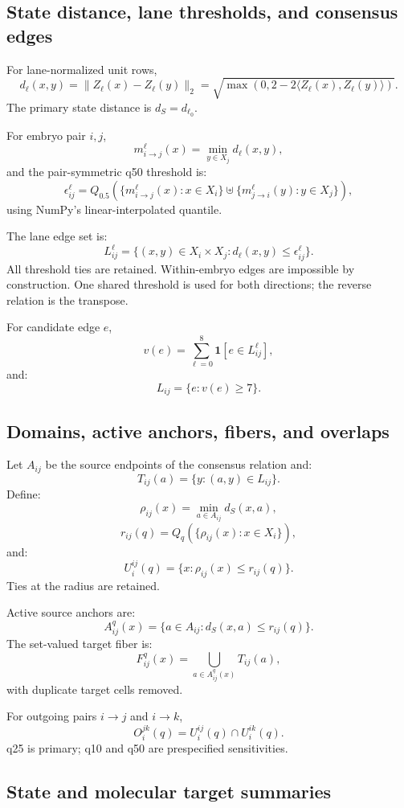\documentclass[11pt]{article}
\begin{document}
\subsection{State distance, lane thresholds, and consensus edges}

For lane-normalized unit rows,
\[
d_\ell(x,y)
=
\|Z_\ell(x)-Z_\ell(y)\|_2
=
\sqrt{
\max\left(
0,
2-2\langle Z_\ell(x),Z_\ell(y)\rangle
\right)
}.
\]
The primary state distance is \(d_S=d_{\ell_0}\).

For embryo pair \(i,j\),
\[
m_{i\to j}^{\ell}(x)
=
\min_{y\in X_j}d_\ell(x,y),
\]
and the pair-symmetric q50 threshold is:
\[
\epsilon_{ij}^{\ell}
=
Q_{0.5}
\left(
\{m_{i\to j}^{\ell}(x):x\in X_i\}
\uplus
\{m_{j\to i}^{\ell}(y):y\in X_j\}
\right),
\]
using NumPy's linear-interpolated quantile.

The lane edge set is:
\[
L_{ij}^{\ell}
=
\{(x,y)\in X_i\times X_j:
d_\ell(x,y)\le\epsilon_{ij}^{\ell}\}.
\]
All threshold ties are retained. Within-embryo edges are impossible by construction. One shared threshold is used for both directions; the reverse relation is the transpose.

For candidate edge \(e\),
\[
v(e)=
\sum_{\ell=0}^{8}
\mathbf 1[e\in L_{ij}^{\ell}],
\]
and:
\[
L_{ij}
=
\{e:v(e)\ge7\}.
\]

\subsection{Domains, active anchors, fibers, and overlaps}

Let \(A_{ij}\) be the source endpoints of the consensus relation and:
\[
T_{ij}(a)=
\{y:(a,y)\in L_{ij}\}.
\]
Define:
\[
\rho_{ij}(x)=
\min_{a\in A_{ij}}d_S(x,a),
\]
\[
r_{ij}(q)=
Q_q
\left(
\{\rho_{ij}(x):x\in X_i\}
\right),
\]
and:
\[
U_i^{ij}(q)
=
\{x:\rho_{ij}(x)\le r_{ij}(q)\}.
\]
Ties at the radius are retained.

Active source anchors are:
\[
A_{ij}^{q}(x)=
\{a\in A_{ij}:d_S(x,a)\le r_{ij}(q)\}.
\]
The set-valued target fiber is:
\[
F_{ij}^{q}(x)=
\bigcup_{a\in A_{ij}^{q}(x)}
T_{ij}(a),
\]
with duplicate target cells removed.

For outgoing pairs \(i\to j\) and \(i\to k\),
\[
O_i^{jk}(q)
=
U_i^{ij}(q)\cap U_i^{ik}(q).
\]
q25 is primary; q10 and q50 are prespecified sensitivities.

\subsection{State and molecular target summaries}
\end{document}

